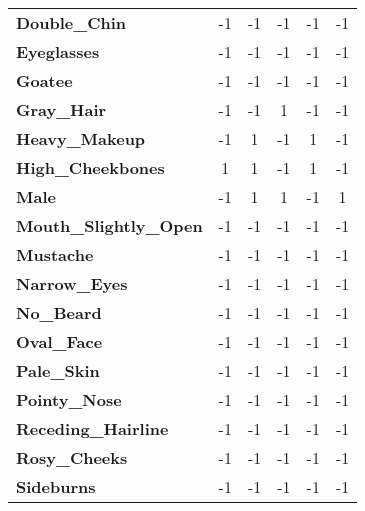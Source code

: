 \begin{table}[hb]
\begin{center}
\begin{tabular}{lccccc}
\textbf{Double\_Chin}          & -1          & -1           & -1              & -1            & -1               \\
\textbf{Eyeglasses}            & -1          & -1           & -1              & -1            & -1               \\
\textbf{Goatee}                & -1          & -1           & -1              & -1            & -1               \\
\textbf{Gray\_Hair}            & -1          & -1           & 1               & -1            & -1               \\
\textbf{Heavy\_Makeup}         & -1          & 1            & -1              & 1             & -1               \\
\textbf{High\_Cheekbones}      & 1           & 1            & -1              & 1             & -1               \\
\textbf{Male}                  & -1          & 1            & 1               & -1            & 1                \\
\textbf{Mouth\_Slightly\_Open} & -1          & -1           & -1              & -1            & -1               \\
\textbf{Mustache}              & -1          & -1           & -1              & -1            & -1               \\
\textbf{Narrow\_Eyes}          & -1          & -1           & -1              & -1            & -1               \\
\textbf{No\_Beard}             & -1          & -1           & -1              & -1            & -1               \\
\textbf{Oval\_Face}            & -1          & -1           & -1              & -1            & -1               \\
\textbf{Pale\_Skin}            & -1          & -1           & -1              & -1            & -1               \\
\textbf{Pointy\_Nose}          & -1          & -1           & -1              & -1            & -1               \\
\textbf{Receding\_Hairline}    & -1          & -1           & -1              & -1            & -1               \\
\textbf{Rosy\_Cheeks}          & -1          & -1           & -1              & -1            & -1               \\
\textbf{Sideburns}             & -1          & -1           & -1              & -1            & -1               \\

\end{tabular}
\end{center}
\end{table}
